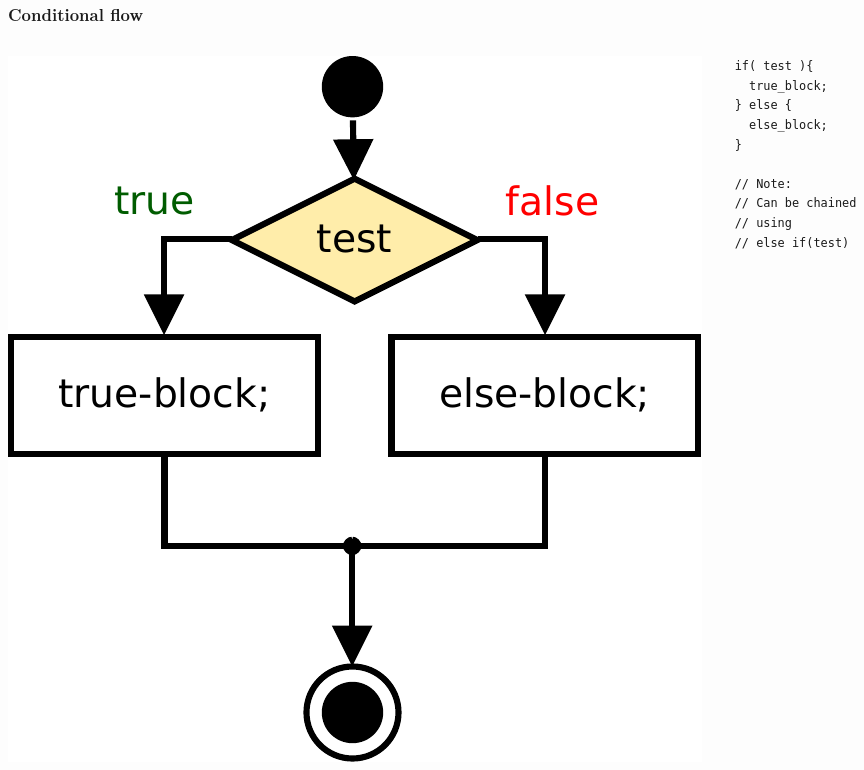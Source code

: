 \begin{frame}[fragile]
\frametitle{Conditional flow}
\begin{columns}[c]
  \begin{column}{0.5\textwidth}
  \hfill
\includegraphics[scale=0.5]{figures/flow-ifelse}
  \end{column}
  \begin{column}{0.5\textwidth}
\begin{lstlisting}
if( test ){
  true_block;
} else {
  else_block;
}

// Note:
// Can be chained
// using
// else if(test)
\end{lstlisting}
  \end{column}
\end{columns}
\end{frame}

